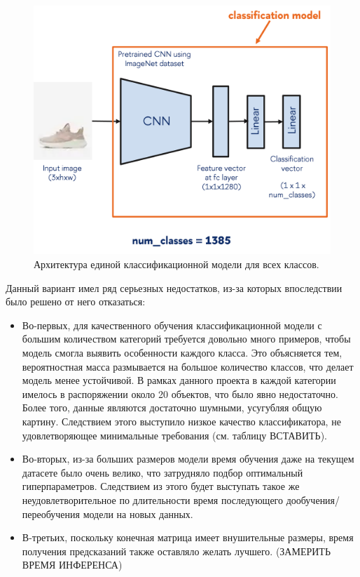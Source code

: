 \documentclass[a4paper,12pt]{extarticle}
\begin{document}
\begin{figure}[ht]
	\centering
	\includegraphics[scale=0.7]{classification_onemodel.png}
	\caption{Архитектура единой классификационной модели для всех классов.}
	\label{fig:classification_onemodel}
\end{figure}

Данный вариант имел ряд серьезных недостатков, из-за которых впоследствии было решено от него отказаться:
\begin{itemize}
	\item Во-первых, для качественного обучения классификационной модели с большим количеством категорий требуется довольно много примеров, чтобы модель смогла выявить особенности каждого класса. Это объясняется тем, вероятностная масса размывается на большое количество классов, что делает модель менее устойчивой. В рамках данного проекта в каждой категории имелось в распоряжении около 20 объектов, что было явно недостаточно. Более того, данные являются достаточно шумными, усугубляя общую картину. Следствием этого выступило низкое качество классификатора, не удовлетворяющее минимальные требования (см. таблицу ВСТАВИТЬ).
	\item Во-вторых, из-за больших размеров модели время обучения даже на текущем датасете было очень велико, что затрудняло подбор оптимальный гиперпараметров. Следствием из этого будет выступать такое же неудовлетворительное по длительности время последующего дообучения/переобучения модели на новых данных.
	\item В-третьих, поскольку конечная матрица имеет внушительные размеры, время получения предсказаний также оставляло желать лучшего. (ЗАМЕРИТЬ ВРЕМЯ ИНФЕРЕНСА)
\end{itemize}
\end{document}
